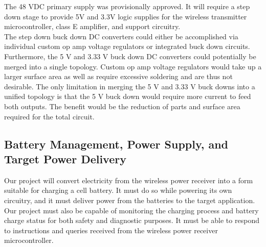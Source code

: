 \documentclass[12pt]{article}
\begin{document}
\indent
The 48 VDC primary supply was provisionally approved. It will require a step down stage to provide 5V and 3.3V logic supplies for the wireless transmitter microcontroller, class E amplifier, and support circuitry.\\

\indent
The step down buck down DC converters could either be accomplished via individual custom op amp voltage regulators or integrated buck down circuits.  Furthermore, the 5 V and 3.33 V buck down DC converters could potentially be merged into a single topology.  Custom op amp voltage regulators would take up a larger surface area as well as require excessive soldering and are thus not desirable.  The only limitation in merging the 5 V and 3.33 V buck downs into a unified topology is that the 5 V buck down would require more current to feed both outputs.  The benefit would be the reduction of parts and surface area required for the total circuit.\\

\subsection{Battery Management, Power Supply, and Target Power Delivery}
\indent \indent
Our project will convert electricity from the wireless power receiver into a form suitable for charging a cell battery. It must do so while powering its own circuitry, and it must deliver power from the batteries to the target application. Our project must also be capable of monitoring the charging process and battery charge status for both safety and diagnostic purposes. It must be able to respond to instructions and queries received from the wireless power receiver microcontroller.\\
\end{document}
